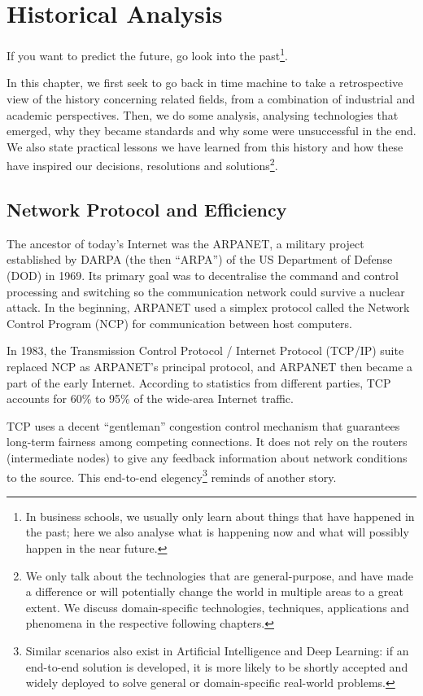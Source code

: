 \chapter{Historical Analysis}\label{chp-his-analysis}
If you want to predict the future, go look into the past\footnote{In business schools, we usually only learn about things that have happened in the past; here we also analyse what is happening now and what will possibly happen in the near future.}. 

In this chapter, we first seek to go back in time machine to take a retrospective view of the history concerning related fields, from a combination of industrial and academic perspectives. Then, we do some analysis, analysing technologies that emerged, why they became standards and why some were unsuccessful in the end. We also state practical lessons we have learned from this history and how these have inspired our decisions, resolutions and solutions\footnote{We only talk about the technologies that are general-purpose, and have made a difference or will potentially change the world in multiple areas to a great extent. We discuss domain-specific technologies, techniques, applications and phenomena in the respective following chapters.}.

\section{Network Protocol and Efficiency}\label{sec-his-analysis-tcp}
The ancestor of today's Internet was the ARPANET, a military project established by DARPA (the then ``ARPA'') of the US Department of Defense (DOD) in 1969. Its primary goal was to decentralise the command and control processing and switching so the communication network could survive a nuclear attack. In the beginning, ARPANET used a simplex protocol called the Network Control Program (NCP) for communication between host computers. 

In 1983, the Transmission Control Protocol / Internet Protocol (TCP/IP) suite replaced NCP as ARPANET's principal protocol, and ARPANET then became a part of the early Internet. According to statistics from different parties, TCP accounts for 60\% to 95\% of the wide-area Internet traffic. 

TCP uses a decent ``gentleman'' congestion control mechanism \cite{Chiu:1989:AIMD} that guarantees long-term fairness among competing connections. It does not rely on the routers (intermediate nodes) to give any feedback information about network conditions to the source. This end-to-end elegency\footnote{Similar scenarios also exist in Artificial Intelligence and Deep Learning: if an end-to-end solution is developed, it is more likely to be shortly accepted and widely deployed to solve general or domain-specific real-world problems.} reminds of another story. 

